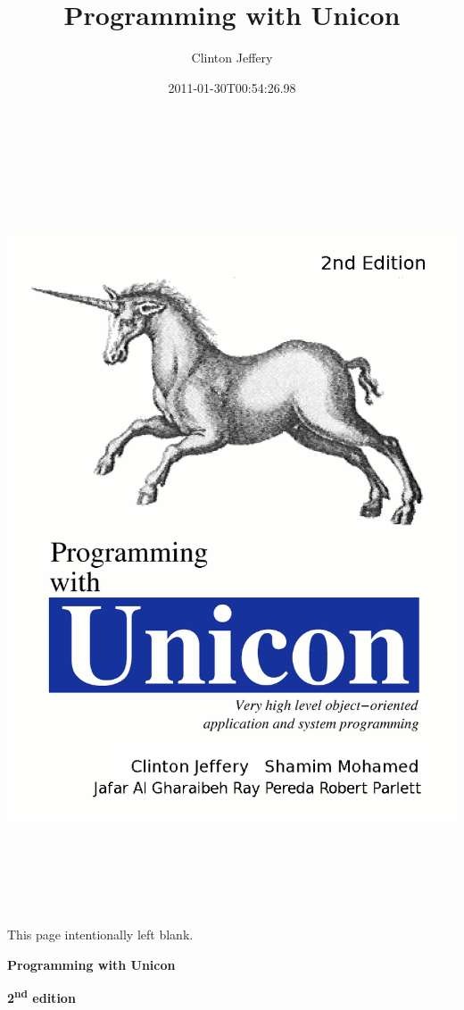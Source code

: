 \documentclass[letterpaper,twoside,12pt]{book}
\title{Programming with Unicon}
\author{Clinton Jeffery}
\date{2011-01-30T00:54:26.98}
\begin{document}
\thispagestyle{empty}
\setlength{\topmargin}{-0.05in}
\hspace{-1.0in}
\includegraphics[width=7.2in,height=8.9in]{ub-img/ub-img1.png}
\clearpage

\bigskip
This page intentionally left blank.
\clearpage

\bigskip
\bigskip
\bigskip
\begin{center}
\bfseries\Huge
Programming with Unicon
\end{center}
\bigskip
\bigskip
\begin{center}
\bfseries\huge
2\textsuperscript{nd} edition
\end{center}
\end{document}
